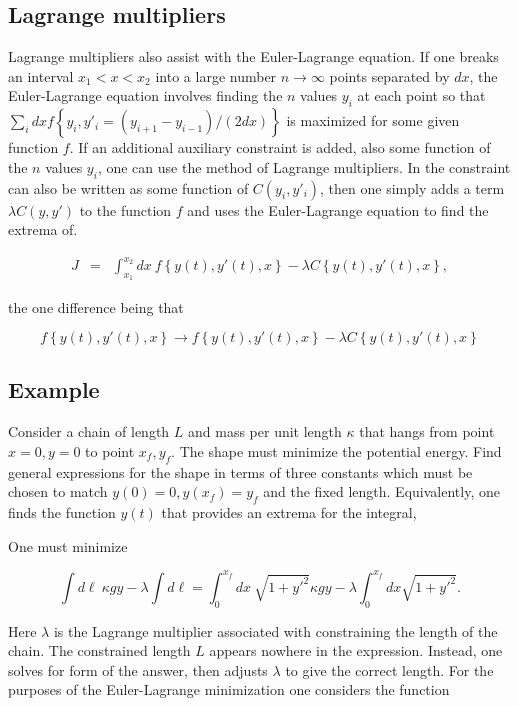 \documentclass[%
oneside,                 %
final,                   %
10pt]{article}
\begin{document}
\subsection{Lagrange multipliers}

Lagrange multipliers also assist with the Euler-Lagrange equation. If
one breaks an interval $x_1<x<x_2$ into a large number
$n\rightarrow\infty$ points separated by $dx$, the Euler-Lagrange
equation involves finding the $n$ values $y_i$ at each point so that
$\sum_i dx f\left\{y_i,y'_i=(y_{i+1}-y_{i-1})/(2dx)\right\}$ is
maximized for some given function $f$. If an additional auxiliary
constraint is added, also some function of the $n$ values $y_i$, one
can use the method of Lagrange multipliers. In the constraint can also
be written as some function of $C(y_i,y'_i)$, then one simply adds a
term $\lambda C(y,y')$ to the function $f$ and uses the Euler-Lagrange
equation to find the extrema of.

\begin{eqnarray}
J&=&\int_{x_1}^{x_2}dx~f\left\{y(t),y'(t),x\right\}-\lambda C\left\{y(t),y'(t),x\right\},
\end{eqnarray}

the one difference being that

\begin{equation}
f\left\{y(t),y'(t),x\right\}\rightarrow f\left\{y(t),y'(t),x\right\}-\lambda C\left\{y(t),y'(t),x\right\}
\end{equation}

\subsection{Example}

Consider a chain of length $L$ and mass per unit length $\kappa$ that
hangs from point $x=0,y=0$ to point $x_f,y_f$. The shape must minimize
the potential energy. Find general expressions for the shape in terms
of three constants which must be chosen to match $y(0)=0, y(x_f)=y_f$
and the fixed length. Equivalently, one finds the function $y(t)$ that
provides an extrema for the integral,

One must minimize

\[
\int d\ell~\kappa gy-\lambda\int d\ell=
\int_0^{x_f} dx~\sqrt{1+y'^2}\kappa gy-\lambda \int_0^{x_f} dx\sqrt{1+y'^2}.
\]

Here $\lambda$ is the Lagrange multiplier associated with constraining
the length of the chain. The constrained length $L$ appears nowhere in
the expression. Instead, one solves for form of the answer, then
adjusts $\lambda$ to give the correct length. For the purposes of the
Euler-Lagrange minimization one considers the function
\end{document}
